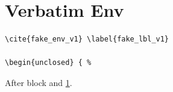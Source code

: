 \documentclass{article}
\begin{document}
\section{Verbatim Env}\label{sec:env_verbatim}
\begin{verbatim}
\cite{fake_env_v1} \label{fake_lbl_v1}

\begin{unclosed} { %
\end{verbatim}
After block \cite{k1} and \ref{sec:env_verbatim}.


\end{document}
